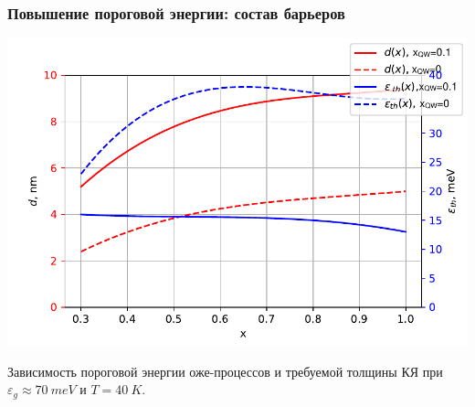 \documentclass[9pt,pdf]{beamer}
\begin{document}
    \begin{frame}
        \frametitle{Повышение пороговой энергии: состав барьеров}
        \begin{center}
            \includegraphics[width=1\textwidth]{images/de_vs_x_R.pdf}
        \end{center}
        Зависимость пороговой энергии оже-процессов и требуемой толщины КЯ
        при $\varepsilon_g \approx 70~meV$ и $T=40~K$.
    \end{frame}
\end{document}
